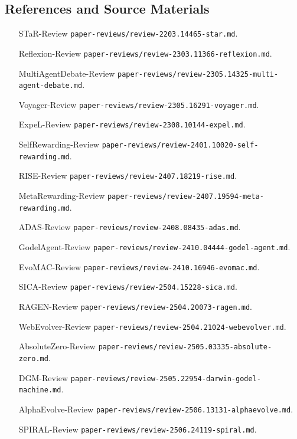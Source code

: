 \subsection{References and Source Materials}\label{sec:ch3-refs}

\begin{itemize}[nosep]
\item [STaR-Review] \texttt{paper-reviews/review-2203.14465-star.md}.
\item [Reflexion-Review] \texttt{paper-reviews/review-2303.11366-reflexion.md}.
\item [MultiAgentDebate-Review] \texttt{paper-reviews/review-2305.14325-multi-agent-debate.md}.
\item [Voyager-Review] \texttt{paper-reviews/review-2305.16291-voyager.md}.
\item [ExpeL-Review] \texttt{paper-reviews/review-2308.10144-expel.md}.
\item [SelfRewarding-Review] \texttt{paper-reviews/review-2401.10020-self-rewarding.md}.
\item [RISE-Review] \texttt{paper-reviews/review-2407.18219-rise.md}.
\item [MetaRewarding-Review] \texttt{paper-reviews/review-2407.19594-meta-rewarding.md}.
\item [ADAS-Review] \texttt{paper-reviews/review-2408.08435-adas.md}.
\item [GodelAgent-Review] \texttt{paper-reviews/review-2410.04444-godel-agent.md}.
\item [EvoMAC-Review] \texttt{paper-reviews/review-2410.16946-evomac.md}.
\item [SICA-Review] \texttt{paper-reviews/review-2504.15228-sica.md}.
\item [RAGEN-Review] \texttt{paper-reviews/review-2504.20073-ragen.md}.
\item [WebEvolver-Review] \texttt{paper-reviews/review-2504.21024-webevolver.md}.
\item [AbsoluteZero-Review] \texttt{paper-reviews/review-2505.03335-absolute-zero.md}.
\item [DGM-Review] \texttt{paper-reviews/review-2505.22954-darwin-godel-machine.md}.
\item [AlphaEvolve-Review] \texttt{paper-reviews/review-2506.13131-alphaevolve.md}.
\item [SPIRAL-Review] \texttt{paper-reviews/review-2506.24119-spiral.md}.

\end{itemize}
